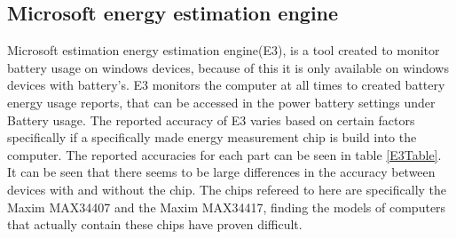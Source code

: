 \subsection{Microsoft energy estimation engine}
Microsoft estimation energy estimation engine(E3), is a tool created to monitor battery usage on windows devices, because of this it is only available on windows devices with battery's. E3 monitors the computer at all times to created battery energy usage reports, that can be accessed in the power battery settings under Battery usage\cite[p.43]{E3WinHec}. The reported accuracy of E3 varies based on certain factors specifically if a specifically made energy measurement chip is build into the computer. The reported accuracies for each part can be seen in table \cref{E3Table}.
%
It can be seen that there seems to be large differences in the accuracy between devices with and without the chip. The chips refereed to here are specifically the Maxim MAX34407 and the Maxim MAX34417, finding the models of computers that actually contain these chips have proven difficult. 

